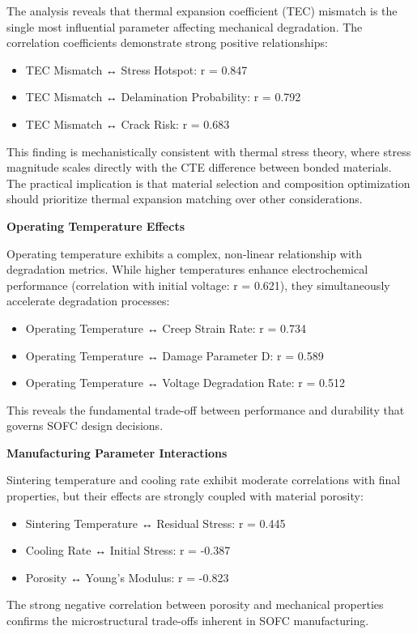 \documentclass[conference]{IEEEtran}
\begin{document}
The analysis reveals that thermal expansion coefficient (TEC) mismatch is the single most influential parameter affecting mechanical degradation. The correlation coefficients demonstrate strong positive relationships:
\begin{itemize}
\item TEC Mismatch ↔ Stress Hotspot: r = 0.847
\item TEC Mismatch ↔ Delamination Probability: r = 0.792
\item TEC Mismatch ↔ Crack Risk: r = 0.683
\end{itemize}

This finding is mechanistically consistent with thermal stress theory, where stress magnitude scales directly with the CTE difference between bonded materials. The practical implication is that material selection and composition optimization should prioritize thermal expansion matching over other considerations.

\textbf{Operating Temperature Effects}

Operating temperature exhibits a complex, non-linear relationship with degradation metrics. While higher temperatures enhance electrochemical performance (correlation with initial voltage: r = 0.621), they simultaneously accelerate degradation processes:
\begin{itemize}
\item Operating Temperature ↔ Creep Strain Rate: r = 0.734
\item Operating Temperature ↔ Damage Parameter D: r = 0.589
\item Operating Temperature ↔ Voltage Degradation Rate: r = 0.512
\end{itemize}

This reveals the fundamental trade-off between performance and durability that governs SOFC design decisions.

\textbf{Manufacturing Parameter Interactions}

Sintering temperature and cooling rate exhibit moderate correlations with final properties, but their effects are strongly coupled with material porosity:
\begin{itemize}
\item Sintering Temperature ↔ Residual Stress: r = 0.445
\item Cooling Rate ↔ Initial Stress: r = -0.387
\item Porosity ↔ Young's Modulus: r = -0.823
\end{itemize}

The strong negative correlation between porosity and mechanical properties confirms the microstructural trade-offs inherent in SOFC manufacturing.
\end{document}
